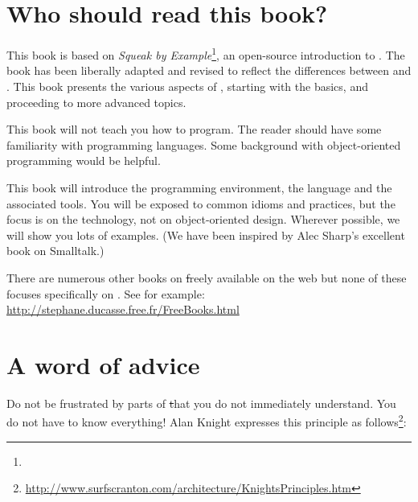 \documentclass[a4paper,10pt,twoside]{book}
\begin{document}
\section*{Who should read this book?}

This book is based on \emph{Squeak by Example}\footnote{\sbe}, an open-source introduction to \squeak.
The book has been liberally adapted and revised to reflect the differences between \pharo and \squeak.
This book presents the various aspects of \pharo, starting with the basics, and proceeding to more advanced topics.

This book will not teach you how to program. The reader should have some familiarity with programming languages. Some background with object-oriented programming would be helpful.

This book will introduce the \pharo programming environment, the language and the associated tools.  You will be exposed to common idioms and practices, but the focus is on the technology, not on object-oriented design. Wherever possible, we will show you lots of examples. (We have been inspired by Alec Sharp's excellent book on Smalltalk\cite{Shar97a}.)

There are numerous other books on \st freely available on the web but none of these focuses specifically on \pharo. See for example:
\url{http://stephane.ducasse.free.fr/FreeBooks.html}

\ifluluelse{}{\newpage} %
\section*{A word of advice}


Do not be frustrated by parts of \st that you do not immediately understand.
You do not have to know everything!
Alan Knight expresses this principle as follows\footnote{\url{http://www.surfscranton.com/architecture/KnightsPrinciples.htm}}:
\end{document}
